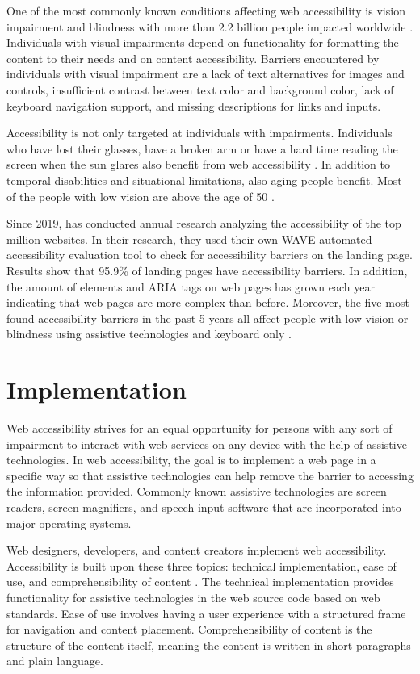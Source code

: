 One of the most commonly known conditions affecting web accessibility is vision impairment and blindness with more than 2.2 billion people impacted worldwide \citep[Chapter~1]{webaccessibility, whovision}. Individuals with visual impairments depend on functionality for formatting the content to their needs and on content accessibility. Barriers encountered by individuals with visual impairment are a lack of text alternatives for images and controls, insufficient contrast between text color and background color, lack of keyboard navigation support, and missing descriptions for links and inputs. 

Accessibility is not only targeted at individuals with impairments. Individuals who have lost their glasses, have a broken arm or have a hard time reading the screen when the sun glares also benefit from web accessibility \citep{w3cbarriers}. In addition to temporal disabilities and situational limitations, also aging people benefit. Most of the people with low vision are above the age of 50 \citep{whovision}.

Since 2019, \textcite{webaimmillions} has conducted annual research analyzing the accessibility of the top million websites. In their research, they used their own WAVE automated accessibility evaluation tool to check for accessibility barriers on the landing page. Results show that 95.9\% of landing pages have accessibility barriers. In addition, the amount of elements and ARIA tags on web pages has grown each year indicating that web pages are more complex than before. Moreover, the five most found accessibility barriers in the past 5 years all affect people with low vision or blindness using assistive technologies and keyboard only \citep{webaimmillions}. 

\section{Implementation}

Web accessibility strives for an equal opportunity for persons with any sort of impairment to interact with web services on any device with the help of assistive technologies. In web accessibility, the goal is to implement a web page in a specific way so that assistive technologies can help remove the barrier to accessing the information provided. Commonly known assistive technologies are screen readers, screen magnifiers, and speech input software that are incorporated into major operating systems.

Web designers, developers, and content creators implement web accessibility. Accessibility is built upon these three topics: technical implementation, ease of use, and comprehensibility of content \citep{webaccessibilitydefinition}. The technical implementation provides functionality for assistive technologies in the web source code based on web standards. Ease of use involves having a user experience with a structured frame for navigation and content placement. Comprehensibility of content is the structure of the content itself, meaning the content is written in short paragraphs and plain language. 

